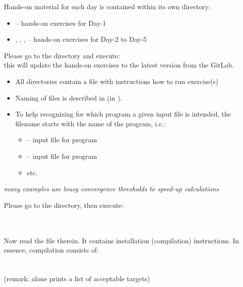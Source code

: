 \documentclass[landscape]{foils}
\begin{document}
Hands-on material for each day is contained within its own directory:
\vspace{-0.5em}
\begin{itemize}
\item {} -- hands-on exercises for Day-1
  \vspace{-0.5em}
\item {}, , ,  -- hands-on
  exercises for Day-2 to Day-5
\end{itemize}

Please go to the  directory and execute: ~\\
this will update the hands-on exercises to the latest version from the
GitLab.
\begin{itemize}
\item All directories contain a  file with instructions
  how to run exercise(s)
\vspace{-0.5em}
\item Naming of files is described in  (in
  ).
\vspace{-0.5em}
\item To help recognizing for which program a given input file is
  intended, the filename starts with the name of the program, i.e.:
  \vspace{-0.5em}
\begin{itemize}
\item {} -- input file for  program
\item {} -- input file for  program
\item etc.
\end{itemize}
\end{itemize}

{ {\em many examples use lousy convergence
    thresholds to speed-up calculations}}

%
Please go to the  directory, then execute:\\[1em]
\\
\\

Now read the  file therein. It contains installation
(compilation) instructions. In essence, compilation consists of:\\[1em]
\\
\\[0.5em]
(remark:  alone prints a list of acceptable targets)
\end{document}
